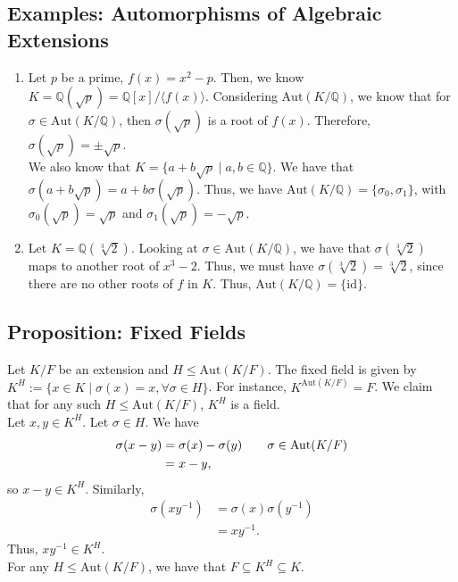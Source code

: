 \documentclass[10pt]{extarticle}
\newcommand{\Q}{\mathbb{Q}}
\begin{document}
  \subsection{Examples: Automorphisms of Algebraic Extensions}%
  \begin{enumerate}[(1)]
    \item Let $p$ be a prime, $f(x) = x^2 - p$. Then, we know $K = \Q(\sqrt{p}) = \Q[x]/\langle f(x)\rangle$. Considering $\text{Aut}(K/\Q)$, we know that for $\sigma \in \text{Aut}(K/\Q)$, then $\sigma(\sqrt{p})$ is a root of $f(x)$. Therefore, $\sigma(\sqrt{p}) = \pm \sqrt{p}$.\\

      We also know that $K = \{a + b\sqrt{p} \mid a,b\in \Q\}$. We have that $\sigma(a + b\sqrt{p}) = a + b\sigma(\sqrt{p})$. Thus, we have $\text{Aut}(K/\Q) = \{\sigma_0,\sigma_1\}$, with $\sigma_0(\sqrt{p}) = \sqrt{p}$ and $\sigma_1(\sqrt{p}) = -\sqrt{p}$.
    \item Let $K = \Q(\sqrt[3]{2})$. Looking at $\sigma \in \text{Aut}(K/\Q)$, we have that $\sigma(\sqrt[3]{2})$ maps to another root of $x^3 - 2$. Thus, we must have $\sigma(\sqrt[3]{2}) = \sqrt[3]{2}$, since there are no other roots of $f$ in $K$. Thus, $\text{Aut}(K/\Q) = \{\text{id}\}$.
  \end{enumerate}
  \subsection{Proposition: Fixed Fields}%
  Let $K/F$ be an extension and $H\leq \text{Aut}(K/F)$. The fixed field is given by $K^{H} := \{x\in K\mid \sigma(x) = x,\forall \sigma \in H\}$. For instance, $K^{\text{Aut}(K/F)} = F$. We claim that for any such $H\leq \text{Aut}(K/F)$, $K^{H}$ is a field.\\

  Let $x,y\in K^{H}$. Let $\sigma \in H$. We have
  \begin{align*}
    \sigma(x-y) &= \sigma(x) - \sigma(y) \tag*{$\sigma \in \text{Aut}(K/F)$}\\
                &= x-y,
  \end{align*}
  so $x-y\in K^{H}$. Similarly,
  \begin{align*}
    \sigma(xy^{-1}) &= \sigma(x)\sigma(y^{-1})\\
                    &= xy^{-1}.
  \end{align*}
  Thus, $xy^{-1}\in K^{H}$.\\

  For any $H\leq \text{Aut}(K/F)$, we have that $F\subseteq K^{H} \subseteq K$.
\end{document}
